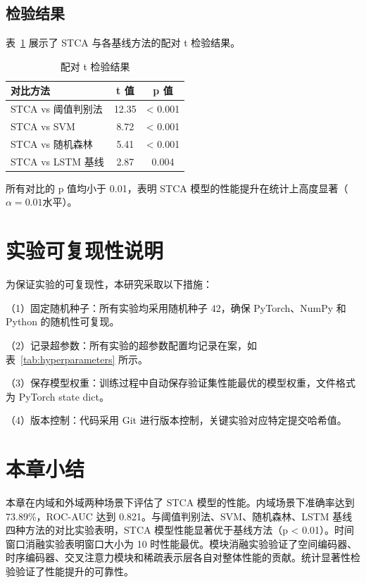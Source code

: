 \subsection{检验结果}

表~\ref{tab:significance-test} 展示了 STCA 与各基线方法的配对 t 检验结果。

\begin{table}[h]
\centering
\caption{配对 t 检验结果}
\label{tab:significance-test}
\begin{tabular}{lcc}
\hline
对比方法 & t 值 & p 值 \\
\hline
STCA vs 阈值判别法 & 12.35 & < 0.001 \\
STCA vs SVM & 8.72 & < 0.001 \\
STCA vs 随机森林 & 5.41 & < 0.001 \\
STCA vs LSTM 基线 & 2.87 & 0.004 \\
\hline
\end{tabular}
\end{table}

所有对比的 p 值均小于 0.01，表明 STCA 模型的性能提升在统计上高度显著（$\alpha = 0.01$水平）。

\section{实验可复现性说明}

为保证实验的可复现性，本研究采取以下措施：

（1）固定随机种子：所有实验均采用随机种子 42，确保 PyTorch、NumPy 和 Python 的随机性可复现。

（2）记录超参数：所有实验的超参数配置均记录在案，如表~\ref{tab:hyperparameters} 所示。

（3）保存模型权重：训练过程中自动保存验证集性能最优的模型权重，文件格式为 PyTorch state dict。

（4）版本控制：代码采用 Git 进行版本控制，关键实验对应特定提交哈希值。

\section{本章小结}

本章在内域和外域两种场景下评估了 STCA 模型的性能。内域场景下准确率达到 73.89\%，ROC-AUC 达到 0.821。与阈值判别法、SVM、随机森林、LSTM 基线四种方法的对比实验表明，STCA 模型性能显著优于基线方法（p < 0.01）。时间窗口消融实验表明窗口大小为 10 时性能最优。模块消融实验验证了空间编码器、时序编码器、交叉注意力模块和稀疏表示层各自对整体性能的贡献。统计显著性检验验证了性能提升的可靠性。

